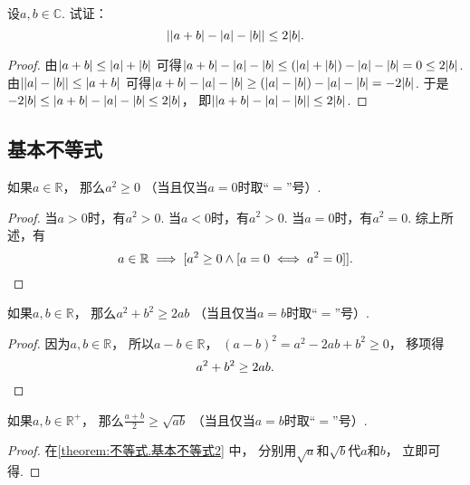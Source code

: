 \begin{example}
设\(a,b \in \mathbb{C}\).
试证：\begin{equation*}
	\abs{
		\abs{a+b}
		- \abs{a}
		- \abs{b}
	}
	\leq 2\abs{b}.
\end{equation*}
\begin{proof}
由\(
	\abs{a+b} \leq \abs{a} + \abs{b}
\)
可得\(
	\abs{a+b} - \abs{a} - \abs{b}
	\leq (\abs{a} + \abs{b}) - \abs{a} - \abs{b}
	= 0
	\leq 2\abs{b}
\).
由\(
	\abs{
		\abs{a} - \abs{b}
	}
	\leq \abs{a+b}
\)
可得\(
	\abs{a+b} - \abs{a} - \abs{b}
	\geq (\abs{a} - \abs{b}) - \abs{a} - \abs{b}
	= -2\abs{b}
\).
于是\(
	-2\abs{b} \leq \abs{a+b} - \abs{a} - \abs{b} \leq 2\abs{b}
\)，
即\(
	\abs{
		\abs{a+b}
		- \abs{a}
		- \abs{b}
	}
	\leq 2\abs{b}
\).
\end{proof}
\end{example}

\subsection{基本不等式}
\begin{theorem}\label{theorem:不等式.基本不等式1}
如果\(a\in\mathbb{R}\)，
那么\(a^2\geq0\)
（当且仅当\(a=0\)时取“\(=\)”号）.
\begin{proof}
当\(a>0\)时，有\(a^2>0\).
当\(a<0\)时，有\(a^2>0\).
当\(a=0\)时，有\(a^2=0\).
综上所述，有\begin{equation*}
	a\in\mathbb{R}
	\implies
	[
		a^2\geq0
		\land
		[a=0 \iff a^2=0]
	].
	\qedhere
\end{equation*}
\end{proof}
\end{theorem}

\begin{theorem}\label{theorem:不等式.基本不等式2}
如果\(a,b\in\mathbb{R}\)，
那么\(a^2 + b^2 \geq 2ab\)
（当且仅当\(a=b\)时取“\(=\)”号）.
\begin{proof}
因为\(a,b\in\mathbb{R}\)，
所以\(a-b\in\mathbb{R}\)，
\((a-b)^2 = a^2 - 2ab + b^2 \geq 0\)，
移项得\begin{equation*}
	a^2 + b^2 \geq 2ab.
	\qedhere
\end{equation*}
\end{proof}
\end{theorem}

\begin{corollary}\label{theorem:不等式.基本不等式2推论1}
如果\(a,b\in\mathbb{R}^+\)，
那么\(\frac{a+b}{2} \geq \sqrt{ab}\)
（当且仅当\(a=b\)时取“\(=\)”号）.
\begin{proof}
在\cref{theorem:不等式.基本不等式2} 中，
分别用\(\sqrt{a}\)和\(\sqrt{b}\)代\(a\)和\(b\)，
立即可得.
\end{proof}
\end{corollary}

